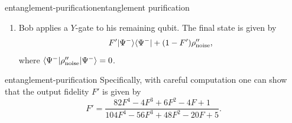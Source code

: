 \begin{topic}{entanglement-purification}{entanglement purification}
\begin{enumerate}[label=(\roman*)]
        \[ F' \ket{\Phi^+} \bra{\Phi^+} + (1 - F') \rho'_\textup{noise} \]
        for some fidelity $F < F' \le 1$, where $\bra{\Phi^+} \rho'_\textup{noise} \ket{\Phi^+} = 0$.
        \item Bob applies a $Y$-gate to his remaining qubit. The final state is given by
        \[ F' |\Psi^-\rangle \langle\Psi^-| + (1 - F') \rho''_\textup{noise} , \]
        where $\langle\Psi^-| \rho''_\textup{noise} |\Psi^-\rangle = 0$.
    \end{enumerate}
\end{topic}

\begin{example}{entanglement-purification}
    Specifically, with careful computation one can show that the output fidelity $F'$ is given by
    \[ F' = \frac{82 F^{4} - 4 F^{3} + 6 F^{2} - 4 F + 1}{104 F^{4} - 56 F^{3} + 48 F^{2} - 20 F + 5} . \]
\end{example}
